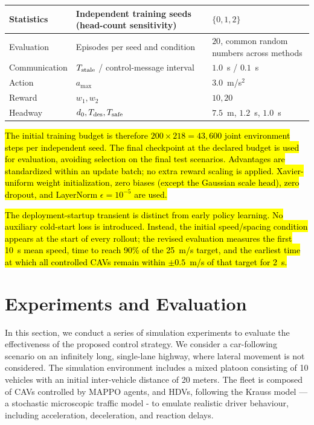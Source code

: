 \documentclass{ieeeaccess}
\begin{document}
\begin{table}[htbp]
\begin{tabular}{|l|l|l|}
\rowcolor{yellow}Statistics & Independent training seeds (head-count sensitivity) & $\{0,1,2\}$ \\ \hline %
\rowcolor{yellow}Evaluation & Episodes per seed and condition & $20$, common random numbers across methods \\ \hline %
\rowcolor{yellow}Communication & $T_{\rm stale}$ / control-message interval & $1.0$~s / $0.1$~s \\ \hline %
\rowcolor{yellow}Action & $a_{\max}$ & $3.0$~m/s$^2$ \\ \hline %
\rowcolor{yellow}Reward & $w_1,w_2$ & $10,20$ \\ \hline %
\rowcolor{yellow}Headway & $d_0,T_{\rm des},T_{\rm safe}$ & $7.5$~m, $1.2$~s, $1.0$~s \\ \hline %
\end{tabular}
\end{table}

\hl{The initial training budget is therefore $200\times218=43{,}600$ joint environment steps per independent seed. The final checkpoint at the declared budget is used for evaluation, avoiding selection on the final test scenarios. Advantages are standardized within an update batch; no extra reward scaling is applied. Xavier-uniform weight initialization, zero biases (except the Gaussian scale head), zero dropout, and LayerNorm $\epsilon=10^{-5}$ are used.} %

\hl{The deployment-startup transient is distinct from early policy learning. No auxiliary cold-start loss is introduced. Instead, the initial speed/spacing condition appears at the start of every rollout; the revised evaluation measures the first 10~s mean speed, time to reach 90\% of the 25~m/s target, and the earliest time at which all controlled CAVs remain within $\pm0.5$~m/s of that target for 2~s.} %

\section{Experiments and Evaluation}
\label{sec:exp_scenario}
In this section, we conduct a series of simulation experiments to evaluate the effectiveness of the proposed control strategy. We consider a car-following scenario on an infinitely long, single-lane highway, where lateral movement is not considered. The simulation environment includes a mixed platoon consisting of 10 vehicles with an initial inter-vehicle distance of 20 meters. The fleet is composed of CAVs controlled by MAPPO agents, and HDVs, following the Krauss model —a stochastic microscopic traffic model - to emulate realistic driver behaviour, including acceleration, deceleration, and reaction delays.
\end{document}
